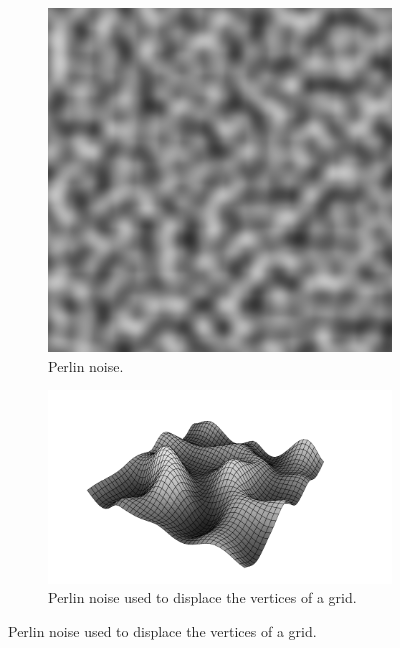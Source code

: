 \documentclass{article}
\begin{document}
\begin{figure}[H]
	\centering
	\begin{subfigure}[h]{0.35\textwidth}
		\includegraphics[width=\textwidth]{img/perlin_noise.png}
		\caption{Perlin noise.}
		\label{fig:pnoise}
	\end{subfigure}
	\hfill
	\begin{subfigure}[h]{0.55\textwidth}
		\includegraphics[width=\textwidth]{img/perlin_terrain.png}
		\caption{Perlin noise used to displace the vertices of a grid.}
		\label{fig:pterrain}
	\end{subfigure}
\end{figure}
\end{document}
